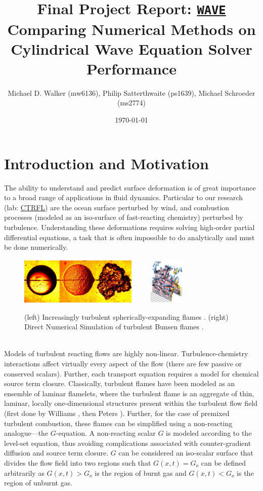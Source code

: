 \documentclass{homework}
\author{Michael D. Walker (mw6136), Philip Satterthwaite (ps1639), Michael Schroeder (ms2774)}
\date{\today}
\title{Final Project Report: \href{https://github.com/mw6136/WAVE}{\texttt{WAVE}}\\ Comparing Numerical Methods on Cylindrical Wave Equation Solver Performance}
\begin{document}
 \maketitle
\section{\textbf{Introduction and Motivation}}
\noindent The ability to understand and predict surface deformation is of great importance to a broad range of applications in fluid dynamics. Particular to our research (lab: \href{https://ctrfl.princeton.edu/}{CTRFL}) are the ocean surface perturbed by wind, and combustion processes (modeled as an iso-surface of fast-reacting chemistry) perturbed by turbulence. Understanding these deformations requires solving high-order partial differential equations, a task that is often impossible to do analytically and must be done numerically.
\begin{figure}[h!]
    \centering
    \includegraphics[width = 0.5\textwidth]{media/Law_3_face.png} $\qquad$
    \includegraphics[width = 0.15\textwidth]{media/Driscoll_DNS.png}
    \caption{(left) Increasingly turbulent spherically-expanding flames \cite{Chaudhuri2015}. (right) Direct Numerical Simulation of turbulent Bunsen flames \cite{Driscoll2008}.}
\end{figure}
\\ \noindent
Models of turbulent reacting flows are highly non-linear. Turbulence-chemistry interactions affect virtually every aspect of the flow (there are few passive or conserved scalars). Further, each transport equation requires a model for chemical source term closure. Classically, turbulent flames have been modeled as an ensemble of laminar flamelets, where the turbulent flame is an aggregate of thin, laminar, locally one-dimensional structures present within the turbulent flow field (first done by Williams \cite{Williams_book}, then Peters \cite{Peters_book}). Further, for the case of premixed turbulent combustion, these flames can be simplified using a non-reacting analogue---the $G$-equation. A non-reacting scalar $G$ is modeled according to the level-set equation, thus avoiding complications associated with counter-gradient diffusion and source term closure. $G$ can be considered an iso-scalar surface that divides the flow field into two regions such that $G(x, t) = G_{o}$ can be defined arbitrarily as $G(x, t) > G_{o}$ is the region of burnt gas and $G(x, t) < G_{o}$ is the region of unburnt gas.
\end{document}
